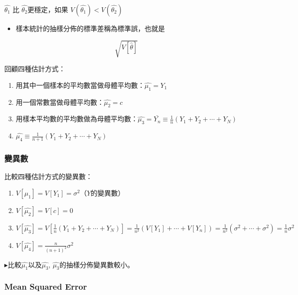 \documentclass[hyperref,]{ctexart}
\providecommand{\tightlist}{%
  \setlength{\itemsep}{0pt}\setlength{\parskip}{0pt}}
\begin{document}
\(\hat{\theta_{1}}\) 比 \(\hat{\theta_{2}}\)更穩定，如果
\(V(\hat{\theta_{1}})< V(\hat{\theta_{2}})\)

\begin{itemize}
\tightlist
\item
  樣本統計的抽樣分佈的標準差稱為標準誤，也就是
\end{itemize}

\[\sqrt{V[\hat{\theta}]}\]

回顧四種估計方式：

\begin{enumerate}
\def\labelenumi{\arabic{enumi}.}
\tightlist
\item
  用其中一個樣本的平均數當做母體平均數：\(\hat{\mu_{1}}=Y_{1}\)
\item
  用一個常數當做母體平均數：\(\hat{\mu_{2}}=c\)
\item
  用樣本平均數的平均數做為母體平均數：\(\hat{\mu_{3}}=\bar{Y_{n}}\equiv \frac{1}{n}(Y_{1}+Y_{2}+\cdots +Y_{N})\)
\item
  \(\hat{\mu_{4}}\equiv \frac{1}{n+1}(Y_{1}+Y_{2}+\cdots +Y_{N})\)
\end{enumerate}

\hypertarget{ux8b8aux7570ux6578}{%
\subsubsection{變異數}\label{ux8b8aux7570ux6578}}

比較四種估計方式的變異數：

\begin{enumerate}
\def\labelenumi{\arabic{enumi}.}
\tightlist
\item
  \(V[\mu_{1}]=V[Y_{1}]=\sigma^2\)（\(Y\)的變異數）
\item
  \(V[\hat{\mu_{2}}]=V[c]=0\)
\item
  \(V[\hat{\mu_{3}}]=V[\frac{1}{n}(Y_{1}+Y_{2}+\cdots +Y_{N})] =\frac{1}{n^2}(V[Y_{1}]+\cdots +V[Y_{n}]) =\frac{1}{n^2}(\sigma^2+\cdots +\sigma^2)=\frac{1}{n}\sigma^2\)
\item
  \(V[\hat{\mu_{4}}]=\frac{n}{(n+1)^2}\sigma^2\)
\end{enumerate}

\(\blacktriangleright\)比較\(\hat{\mu_{1}}\)以及\(\hat{\mu_{3}}\),
\(\hat{\mu_{3}}\)的抽樣分佈變異數較小。

\hypertarget{mean-squared-error}{%
\subsubsection{Mean Squared Error}\label{mean-squared-error}}
\end{document}
